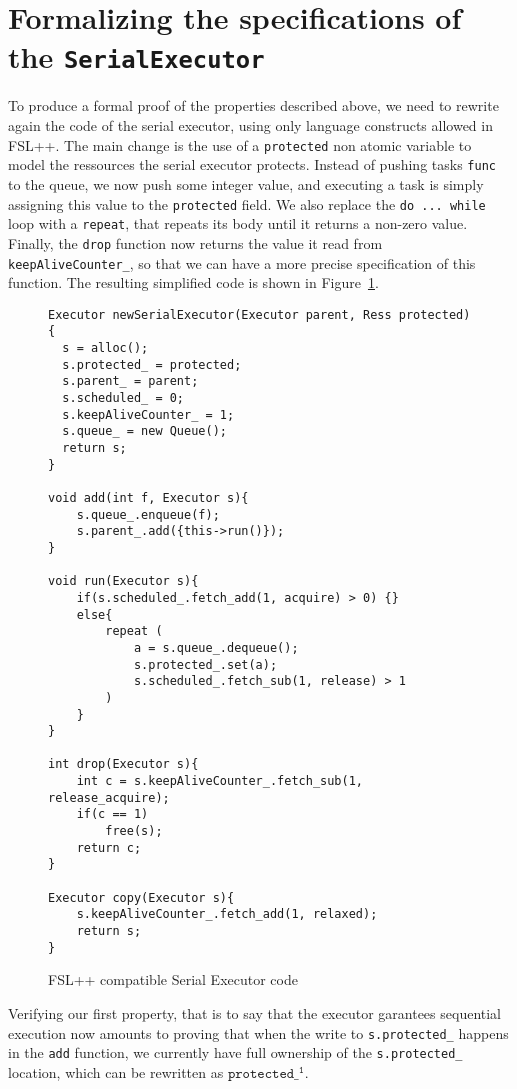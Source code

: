 \section{Formalizing the specifications of the \texttt{SerialExecutor}}

To produce a formal proof of the properties described above, we need to rewrite again the code of the serial executor, using only language constructs allowed in FSL++. The main change is the use of a \texttt{protected} non atomic variable to model the ressources the serial executor protects. Instead of pushing tasks \texttt{func} to the queue, we now push some integer value, and executing a task is simply assigning this value to the \texttt{protected} field. We also replace the \texttt{do ... while} loop with a \texttt{repeat}, that repeats its body until it returns a non-zero value. Finally, the \texttt{drop} function now returns the value it read from \texttt{keepAliveCounter\_}, so that we can have a more precise specification of this function. The resulting simplified code is shown in Figure~\ref{fig:serialExecCP}.

\begin{figure}
	\begin{lstlisting}
Executor newSerialExecutor(Executor parent, Ress protected){
  s = alloc();
  s.protected_ = protected;
  s.parent_ = parent;
  s.scheduled_ = 0;
  s.keepAliveCounter_ = 1;
  s.queue_ = new Queue();
  return s;
}

void add(int f, Executor s){
	s.queue_.enqueue(f);
	s.parent_.add({this->run()});
}

void run(Executor s){
	if(s.scheduled_.fetch_add(1, acquire) > 0) {}
	else{
		repeat (
			a = s.queue_.dequeue();
			s.protected_.set(a);
			s.scheduled_.fetch_sub(1, release) > 1
		)
	}
}

int drop(Executor s){
	int c = s.keepAliveCounter_.fetch_sub(1, release_acquire);
	if(c == 1)
		free(s);
	return c;
}

Executor copy(Executor s){
	s.keepAliveCounter_.fetch_add(1, relaxed);
	return s;
}
	\end{lstlisting}


	\caption{FSL++ compatible Serial Executor code}
	\label{fig:serialExecCP}
\end{figure}

Verifying our first property, that is to say that the executor garantees sequential execution now amounts to proving that when the write to \texttt{s.protected\_} happens in the \texttt{add} function, we currently have full ownership of the \texttt{s.protected\_} location, which can be rewritten as $\mathtt{protected\_^1}$.

